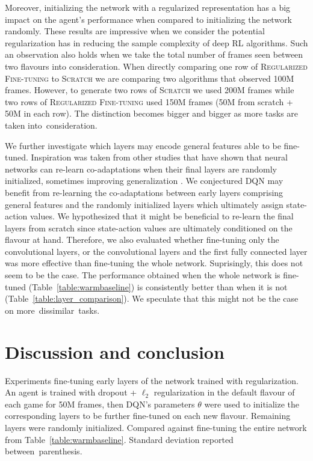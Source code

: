\documentclass{article}
\begin{document}
Moreover, initializing the network with a regularized representation has a big impact on the agent's performance when compared to initializing the network randomly. These results are impressive when we consider the potential regularization has in reducing the sample complexity of deep RL algorithms.
Such an observation also holds when we take the total number of frames seen between two flavours into consideration.
When directly comparing one row of \textsc{Regularized Fine-tuning} to \textsc{Scratch} we are comparing two algorithms that observed 100M frames. However, to generate two rows of \textsc{Scratch} we used 200M frames while two rows of \textsc{Regularized Fine-tuning} used 150M frames (50M from scratch + 50M in each row). The distinction becomes bigger and bigger as more tasks are taken into~consideration.

We further investigate which layers may encode general features able to be fine-tuned. Inspiration was taken from other studies that have shown that neural networks can re-learn co-adaptations when their final layers are randomly initialized, sometimes improving generalization \citep{Yosinski14}. We conjectured DQN may benefit from re-learning the co-adaptations between early layers comprising general features and the randomly initialized layers which ultimately assign state-action values. We hypothesized that it might be beneficial to re-learn the final layers from scratch since state-action values are ultimately conditioned on the flavour at hand. Therefore, we also evaluated whether fine-tuning only the convolutional layers, or the convolutional layers and the first fully connected layer was more effective than fine-tuning the whole network. Suprisingly, this does not seem to be the case. The performance obtained when the whole network is fine-tuned (Table~\ref{table:warmbaseline}) is consistently better than when it is not (Table~\ref{table:layer_comparison}). We speculate that this might not be the case on more~dissimilar~tasks.


\section{Discussion and conclusion}

\begin{table}[t]
    \centering
    \resizebox{\textwidth}{!}{
        
    }
    \caption{Experiments fine-tuning early layers of the network trained with regularization. An agent is trained with dropout + $\ell_2$ regularization in the default flavour of each game for 50M frames, then DQN's parameters $\theta$ were used to initialize the corresponding layers to be further fine-tuned on each new flavour. Remaining layers were randomly initialized. Compared against fine-tuning the entire network from Table~\ref{table:warmbaseline}. Standard deviation reported between~parenthesis.}
    \label{table:layer_comparison}
\end{table}
\end{document}
